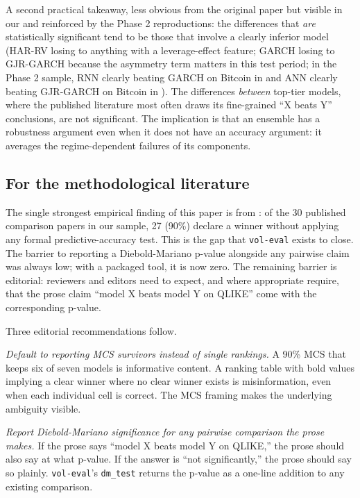 A second practical takeaway, less obvious from the original paper but visible in our  and reinforced by the Phase 2 reproductions: the differences that \emph{are} statistically significant tend to be those that involve a clearly inferior model (HAR-RV losing to anything with a leverage-effect feature; GARCH losing to GJR-GARCH because the asymmetry term matters in this test period; in the Phase 2 sample, RNN clearly beating GARCH on Bitcoin in \citet{Shen2021} and ANN clearly beating GJR-GARCH on Bitcoin in \citet{MostafaSahaIslamNguyen2021}). The differences \emph{between} top-tier models, where the published literature most often draws its fine-grained ``X beats Y'' conclusions, are not significant. The implication is that an ensemble has a robustness argument even when it does not have an accuracy argument: it averages the regime-dependent failures of its components.

\subsection{For the methodological literature}

The single strongest empirical finding of this paper is from : of the 30 published comparison papers in our sample, 27 (90\%) declare a winner without applying any formal predictive-accuracy test. This is the gap that \texttt{vol-eval} exists to close. The barrier to reporting a Diebold-Mariano p-value alongside any pairwise claim was always low; with a packaged tool, it is now zero. The remaining barrier is editorial: reviewers and editors need to expect, and where appropriate require, that the prose claim ``model X beats model Y on QLIKE'' come with the corresponding p-value.

Three editorial recommendations follow.

\textit{Default to reporting MCS survivors instead of single rankings.} A 90\% MCS that keeps six of seven models is informative content. A ranking table with bold values implying a clear winner where no clear winner exists is misinformation, even when each individual cell is correct. The MCS framing makes the underlying ambiguity visible.

\textit{Report Diebold-Mariano significance for any pairwise comparison the prose makes.} If the prose says ``model X beats model Y on QLIKE,'' the prose should also say at what p-value. If the answer is ``not significantly,'' the prose should say so plainly. \texttt{vol-eval}'s \texttt{dm\_test} returns the p-value as a one-line addition to any existing comparison.

